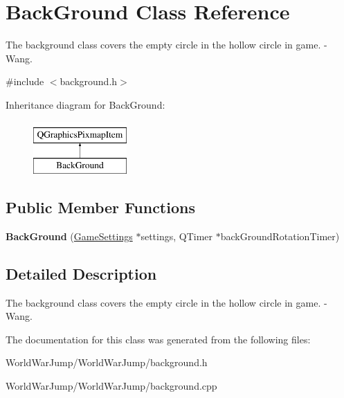 \hypertarget{class_back_ground}{}\section{Back\+Ground Class Reference}
\label{class_back_ground}


The background class covers the empty circle in the hollow circle in game. -\/ Wang.  




{\ttfamily \#include $<$background.\+h$>$}

Inheritance diagram for Back\+Ground\+:\begin{figure}[H]
\begin{center}
\leavevmode
\includegraphics[height=2.000000cm]{class_back_ground}
\end{center}
\end{figure}
\subsection*{Public Member Functions}
\begin{DoxyCompactItemize}
\item 
{\bfseries Back\+Ground} (\hyperlink{class_game_settings}{Game\+Settings} $\ast$settings, Q\+Timer $\ast$back\+Ground\+Rotation\+Timer)\hypertarget{class_back_ground_a30f171b979fa95cff7e4beea65da174e}{}\label{class_back_ground_a30f171b979fa95cff7e4beea65da174e}

\end{DoxyCompactItemize}


\subsection{Detailed Description}
The background class covers the empty circle in the hollow circle in game. -\/ Wang. 

The documentation for this class was generated from the following files\+:\begin{DoxyCompactItemize}
\item 
World\+War\+Jump/\+World\+War\+Jump/background.\+h\item 
World\+War\+Jump/\+World\+War\+Jump/background.\+cpp\end{DoxyCompactItemize}
